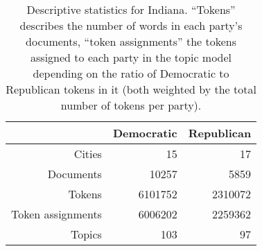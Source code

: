 \begin{table}[ht]
\centering
\begin{tabular}{rrr}
  \hline
 & Democratic & Republican \\ 
  \hline
Cities & 15 & 17 \\ 
  Documents & 10257 & 5859 \\ 
  Tokens & 6101752 & 2310072 \\ 
  Token assignments & 6006202 & 2259362 \\ 
  Topics & 103 & 97 \\ 
   \hline
\end{tabular}
\caption{Descriptive statistics for Indiana. ``Tokens'' describes the number
             of words in each party's documents, ``token assignments'' the tokens assigned
             to each party in the topic model depending on the ratio of Democratic to Republican 
             tokens in it (both weighted by the total number of tokens per party).} 
\label{tabDescriptiveIN}
\end{table}

